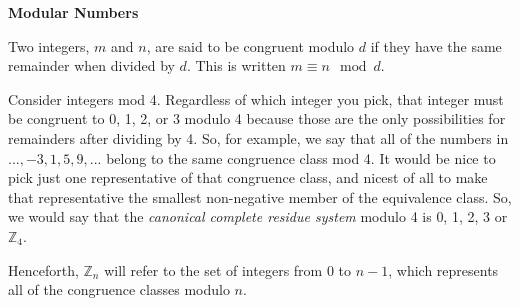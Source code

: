 \documentclass{article}
\begin{document}
\begin{flushleft}
      \LARGE\textbf{Modular Numbers}\normalsize\\ \vspace{11pt}

      Two integers, $m$ and $n$, are said to be congruent modulo $d$ if they have the same remainder when divided by $d$. This is written $m \equiv n \mod{d}$.\\ \vspace{11pt}

      Consider integers mod 4. Regardless of which integer you pick, that integer must be congruent to 0, 1, 2, or 3 modulo 4 because those are the only possibilities for remainders after dividing by 4. So, for example, we say that all of the numbers in ${..., -3, 1, 5, 9,...}$ belong to the same congruence class mod 4. It would be nice to pick just one representative of that congruence class, and nicest of all to make that representative the smallest non-negative member of the equivalence class. So, we would say that the \textit{canonical complete residue system} modulo 4 is {0, 1, 2, 3} or $\mathbb{Z}_{4}$.\\ \vspace{11pt}

      Henceforth, $\mathbb{Z}_{n}$ will refer to the set of integers from 0 to $n-1$, which represents all of the congruence classes modulo $n$.
\end{flushleft}
\end{document}
